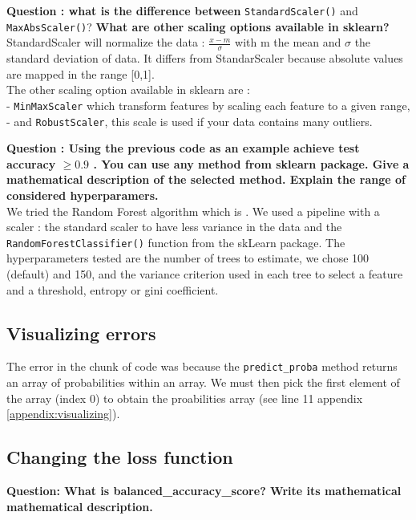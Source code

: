 \textbf{Question : what is the difference between} \verb|StandardScaler()| and \verb|MaxAbsScaler()|? \textbf{What are other scaling options available in sklearn? }\\
StandardScaler will normalize the data : $\frac{x-m}{\sigma}$ with m the mean and $\sigma$ the standard deviation of data. It differs from StandarScaler because absolute values are mapped in the range [0,1]. \\
The other scaling option available in sklearn are : \\
- \verb|MinMaxScaler| which transform features by scaling each feature to a given range, \\
- and \verb|RobustScaler|, this scale is used if your data contains many outliers. \\ 

\textbf{Question : Using the previous code as an example achieve test accuracy  $\geq0.9$ . You can use any method from sklearn package. Give a mathematical description of the selected method. Explain the range of considered hyperparamers.}\\
We tried the Random Forest algorithm which is . We used a pipeline with a scaler : the standard scaler to have less variance in the data and the \verb|RandomForestClassifier()| function from the skLearn package. The hyperparameters tested are the number of trees to estimate, we chose 100 (default) and 150,  and the variance criterion used in each tree to select a feature and a threshold, entropy or gini coefficient.


\subsection{Visualizing errors}
The error in the chunk of code was because the \verb|predict_proba| method returns an array of probabilities within an array. We must then pick the first element of the array (index 0) to obtain the proabilities array (see line 11 appendix \ref{appendix:visualizing}).\\

\subsection{Changing the loss function}
 
\textbf{Question: What is balanced\_accuracy\_score? Write its mathematical mathematical description.} \\

